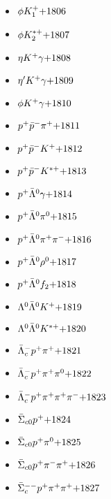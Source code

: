 \begin{multicols}{3}
\begin{itemize}
 \item $ \phi K_{1}^{+} \hfill{+1806}$
 \item $ \phi K_{2}^{*+} \hfill{+1807}$
 \item $ \eta K^{+} \gamma \hfill{+1808}$
 \item $ {\eta^{\prime}} K^{+} \gamma \hfill{+1809}$
 \item $ \phi K^{+} \gamma \hfill{+1810}$
 \item $ p^{+} \bar{p}^{-} \pi^{+} \hfill{+1811}$
 \item $ p^{+} \bar{p}^{-} K^{+} \hfill{+1812}$
 \item $ p^{+} \bar{p}^{-} K^{*+} \hfill{+1813}$
 \item $ p^{+} \bar{\Lambda}^{0} \gamma \hfill{+1814}$
 \item $ p^{+} \bar{\Lambda}^{0} \pi^{0} \hfill{+1815}$
 \item $ p^{+} \bar{\Lambda}^{0} \pi^{+} \pi^{-} \hfill{+1816}$
 \item $ p^{+} \bar{\Lambda}^{0} \rho^{0} \hfill{+1817}$
 \item $ p^{+} \bar{\Lambda}^{0} f_{2} \hfill{+1818}$
 \item $ \Lambda^{0} \bar{\Lambda}^{0} K^{+} \hfill{+1819}$
 \item $ \Lambda^{0} \bar{\Lambda}^{0} K^{*+} \hfill{+1820}$
 \item $ \bar{\Lambda}_{c}^{-} p^{+} \pi^{+} \hfill{+1821}$
 \item $ \bar{\Lambda}_{c}^{-} p^{+} \pi^{+} \pi^{0} \hfill{+1822}$
 \item $ \bar{\Lambda}_{c}^{-} p^{+} \pi^{+} \pi^{+} \pi^{-} \hfill{+1823}$
 \item $ \bar{\Sigma}_{c0} p^{+} \hfill{+1824}$
 \item $ \bar{\Sigma}_{c0} p^{+} \pi^{0} \hfill{+1825}$
 \item $ \bar{\Sigma}_{c0} p^{+} \pi^{-} \pi^{+} \hfill{+1826}$
 \item $ \bar{\Sigma}_{c}^{--} p^{+} \pi^{+} \pi^{+} \hfill{+1827}$
 \end{itemize} 
 \end{multicols} 
